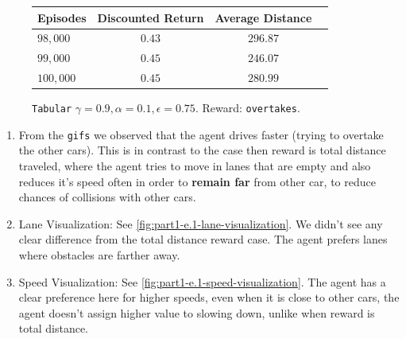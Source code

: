 \begin{figure}[H]
    \vspace{1em}
    \begin{minipage}{\linewidth}
        \centering
        \begin{tabular}{lccc}
            \hline
            Episodes & Discounted Return & Average Distance \\
            \hline
            $98,000$ & $0.43$ & $296.87$ \\
            $99,000$ & $0.45$ & $246.07$ \\
            $100,000$ & $0.45$ & $280.99$ \\
            \hline
        \end{tabular}
        \caption{\texttt{Tabular} $\gamma = 0.9, \alpha = 0.1, \epsilon = 0.75$. Reward: \texttt{overtakes}.}
    \end{minipage}
     \label{fig:part1-e2}
\end{figure}

\begin{enumerate}
    \item From the \texttt{gifs} we observed that the agent drives faster (trying to overtake the other cars). This is in contrast to the case then reward is total distance traveled, where the agent tries to move in lanes that are empty and also reduces it's speed often in order to \textbf{remain far} from other car, to reduce chances of collisions with other cars.
\item Lane Visualization: See \autoref{fig:part1-e.1-lane-visualization}. We didn't see any clear difference from the total distance reward case. The agent prefers lanes where obstacles are farther away.
\item Speed Visualization:  See \autoref{fig:part1-e.1-speed-visualization}. The agent has a clear preference here for higher speeds, even when it is close to other cars, the agent doesn't assign higher value to slowing down, unlike when reward is total distance. 
\end{enumerate}

